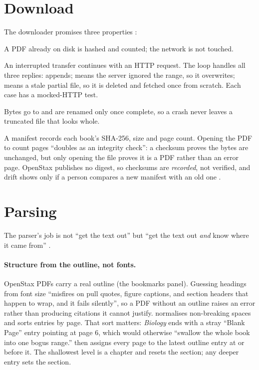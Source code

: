\section{Download}

The downloader promises three properties :
\begin{description}[style=sameline,leftmargin=2.6cm,font=\normalfont\bfseries]
  \item[Idempotent.] A PDF already on disk is hashed and counted; the network is not touched.
  \item[Resumable.] An interrupted transfer continues with an HTTP  request. The loop handles all three replies:  appends;  means the server ignored the range, so it overwrites;  means a stale partial file, so it is deleted and fetched once from scratch. Each case has a mocked-HTTP test.
  \item[Atomic.] Bytes go to  and are renamed only once complete, so a crash never leaves a truncated file that looks whole.
\end{description}
A manifest records each book's SHA-256, size and page count. Opening the PDF to count pages ``doubles as an integrity check'': a checksum proves the bytes are unchanged, but only opening the file proves it is a PDF rather than an error page. OpenStax publishes no digest, so checksums are \emph{recorded}, not verified, and drift shows only if a person compares a new manifest with an old one \tagI.

\section{Parsing}
\label{sec:parse}

The parser's job is not ``get the text out'' but ``get the text out \emph{and} know where it came from'' .

\paragraph{Structure from the outline, not fonts.} OpenStax PDFs carry a real outline (the bookmarks panel). Guessing headings from font size ``misfires on pull quotes, figure captions, and section headers that happen to wrap, and it fails silently'', so a PDF without an outline raises an error rather than producing citations it cannot justify.  normalises non-breaking spaces and sorts entries by page. That sort matters: \emph{Biology} ends with a stray ``Blank Page'' entry pointing at page 6, which would otherwise ``swallow the whole book into one bogus range.''  then assigns every page to the latest outline entry at or before it. The shallowest level is a chapter and resets the section; any deeper entry sets the section.

